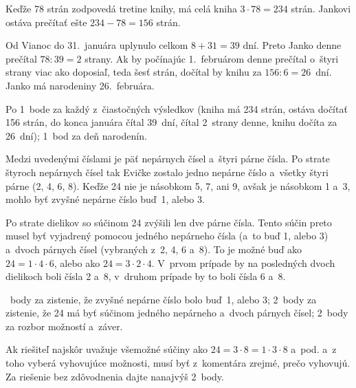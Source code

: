 {%
Keďže 78 strán zodpovedá tretine knihy, má celá kniha $3\cdot 78=234$ strán.
Jankovi ostáva prečítať ešte $234-78=156$ strán.

Od Vianoc do 31.~januára uplynulo celkom $8+31=39$ dní.
Preto Janko denne prečítal $78:39=2$ strany.
Ak by počínajúc 1.~februárom denne prečítal o~štyri strany viac
ako doposiaľ, teda šesť strán, dočítal by knihu za $156:6=26$~dní.
Janko má narodeniny 26.~februára.

\hodnotenie
Po 1~bode za každý z~čiastočných výsledkov
(kniha má 234 strán, ostáva dočítať 156 strán, do konca januára čítal 39~dní, čítal 2~strany denne, knihu dočíta za 26~dní);
1~bod za deň narodenín.
\endhodnotenie
}

{%
Medzi uvedenými číslami je päť nepárnych čísel a~štyri párne čísla.
Po strate štyroch nepárnych čísel tak Evičke zostalo jedno nepárne číslo a~všetky štyri párne (2, 4, 6, 8).
Keďže 24 nie je násobkom 5, 7, ani 9, avšak je násobkom 1 a~3, mohlo byť zvyšné nepárne číslo buď~1, alebo 3.

Po strate dielikov so súčinom 24 zvýšili len dve párne čísla.
Tento súčin preto musel byť vyjadrený pomocou jedného nepárneho čísla (a~to buď 1, alebo 3) a~dvoch párnych čísel (vybraných z~2, 4, 6 a~8).
To je možné buď ako $24=1\cdot4\cdot 6$, alebo ako $24=3\cdot2\cdot 4$.
V~prvom prípade by na posledných dvoch dielikoch boli čísla 2 a~8, v~druhom prípade by to boli čísla 6 a~8.

~body za zistenie, že zvyšné nepárne číslo bolo buď~1, alebo 3;
2~body za zistenie, že 24 má byť súčinom jedného nepárneho a~dvoch párnych čísel;
2~body za rozbor možností a~záver.

Ak riešiteľ najskôr uvažuje všemožné súčiny ako $24=3\cdot8=1\cdot3\cdot8$ a~pod. a~z toho vyberá vyhovujúce možnosti, musí byť z~komentára zrejmé, prečo vyhovujú.
Za riešenie bez zdôvodnenia dajte nanajvýš 2~body.
\endhodnotenie
}

